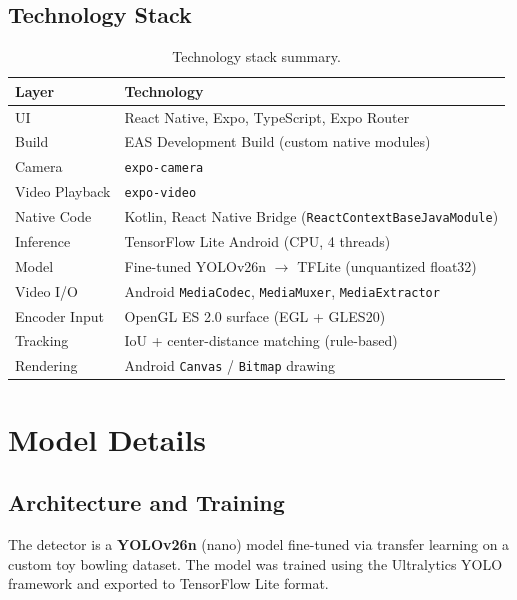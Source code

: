 \documentclass{zc-ust-hw}
\begin{document}
\subsection{Technology Stack}

\begin{table}[H]
\centering
\begin{tabularx}{\textwidth}{lX}
\toprule
\textbf{Layer} & \textbf{Technology} \\
\midrule
UI               & React Native, Expo, TypeScript, Expo Router \\
Build            & EAS Development Build (custom native modules) \\
Camera           & \texttt{expo-camera} \\
Video Playback   & \texttt{expo-video} \\
Native Code      & Kotlin, React Native Bridge (\texttt{ReactContextBaseJavaModule}) \\
Inference        & TensorFlow Lite Android (CPU, 4 threads) \\
Model            & Fine-tuned YOLOv26n $\rightarrow$ TFLite (unquantized float32) \\
Video I/O        & Android \texttt{MediaCodec}, \texttt{MediaMuxer}, \texttt{MediaExtractor} \\
Encoder Input    & OpenGL ES 2.0 surface (EGL + GLES20) \\
Tracking         & IoU + center-distance matching (rule-based) \\
Rendering        & Android \texttt{Canvas} / \texttt{Bitmap} drawing \\
\bottomrule
\end{tabularx}
\caption{Technology stack summary.}
\end{table}

\section{Model Details}

\subsection{Architecture and Training}

The detector is a \textbf{YOLOv26n} (nano) model fine-tuned via transfer learning on a custom toy bowling dataset.
The model was trained using the Ultralytics YOLO framework and exported to TensorFlow Lite format.
\end{document}
